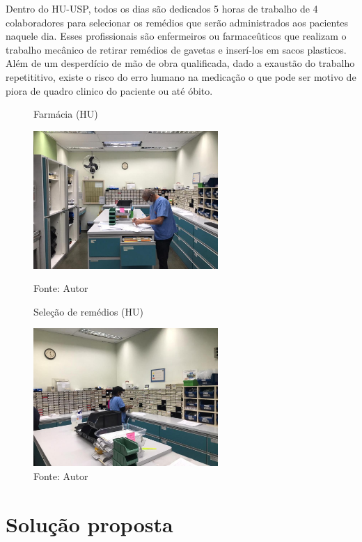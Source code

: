 \documentclass[../poliXuniversity_hospital_(USP)_report.tex]{subfiles}
\begin{document}
Dentro do HU-USP, todos os dias são dedicados 5 horas de trabalho de 4 colaboradores para selecionar os remédios que serão administrados aos pacientes naquele dia. Esses profissionais são enfermeiros ou farmaceûticos que realizam o trabalho mecânico de retirar remédios de gavetas e inserí-los em sacos plasticos. Além de um desperdício de mão de obra qualificada, dado a exaustão do trabalho repetititivo, existe o risco do erro humano na medicação o que pode ser motivo de piora de quadro clinico do paciente ou até óbito. 
\begin{figure}[h]
\centering
    \begin{minipage}{0.5\textwidth}
       \centering
        \caption{Farmácia (HU)}
        \centering %
        \includegraphics[width=7cm]{images/farmacia_1.jpeg}
        \caption*{Fonte: Autor}
        
    \end{minipage}\hfill
    \begin{minipage}{0.5\textwidth}
        \centering
        \caption{Seleção de remédios (HU)}
        \centering %
        \includegraphics[width=7cm]{images/farmacia_2.jpeg}
        \caption*{Fonte: Autor}
    \end{minipage}\hfill
    \label{figura: Farmácia (HU)}
\end{figure}

\section{Solução proposta}
\end{document}
